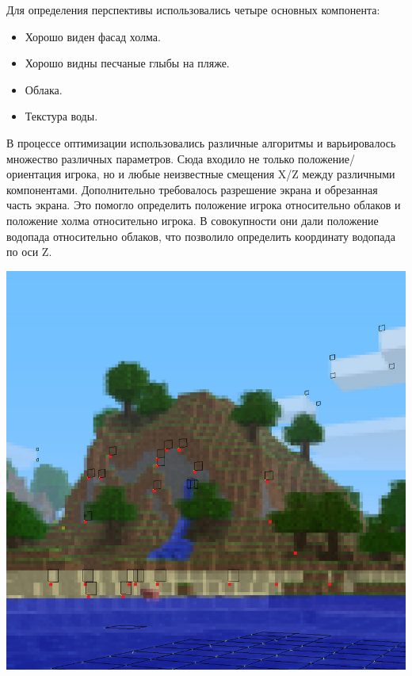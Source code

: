 Для определения перспективы использовались четыре основных компонента:
\begin{itemize} %
    \item Хорошо виден фасад холма.
    \item Хорошо видны песчаные глыбы на пляже.
    \item Облака.
    \item Текстура воды.
\end{itemize}
В процессе оптимизации использовались различные алгоритмы и варьировалось множество различных параметров. Сюда входило не только положение/ориентация игрока, но и любые неизвестные смещения X/Z между различными компонентами. Дополнительно требовалось разрешение экрана и обрезанная часть экрана. Это помогло определить положение игрока относительно облаков и положение холма относительно игрока. В совокупности они дали положение водопада относительно облаков, что позволило определить координату водопада по оси Z.  

\begin{center}
    \includegraphics[width=\linewidth]{pfold.png}
\end{center}

